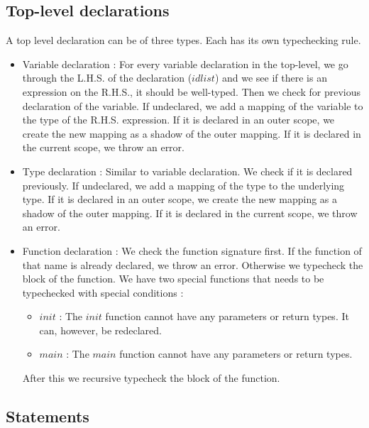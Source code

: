 \documentclass[preprint,12pt]{elsarticle}
\begin{document}
\subsection{Top-level declarations}

A top level declaration can be of three types. Each has its own typechecking rule. 
\begin{itemize}
\item Variable declaration : For every variable declaration in the top-level, we go through the L.H.S. of the declaration ($idlist$) and we see if there is an expression on the R.H.S., it should be well-typed. Then we check for previous declaration of the variable. If undeclared, we add a mapping of the variable to the type of the R.H.S. expression. If it is declared in an outer scope, we create the new mapping as a shadow of the outer mapping. If it is declared in the current scope, we throw an error.
\item Type declaration : Similar to variable declaration. We check if it is declared previously. If undeclared, we add a mapping of the type to the underlying type. If it is declared in an outer scope, we create the new mapping as a shadow of the outer mapping. If it is declared in the current scope, we throw an error.
\item Function declaration : We check the function signature first. If the function of that name is already declared, we throw an error. Otherwise we typecheck the block of the function. We have two special functions that needs to be typechecked with special conditions : 
\begin{itemize}
\item $init$ : The $init$ function cannot have any parameters or return types. It can, however, be redeclared.
\item $main$ : The $main$ function cannot have any parameters or return types.
\end{itemize}
After this we recursive typecheck the block of the function.
\end{itemize}

\subsection{Statements}
\end{document}
